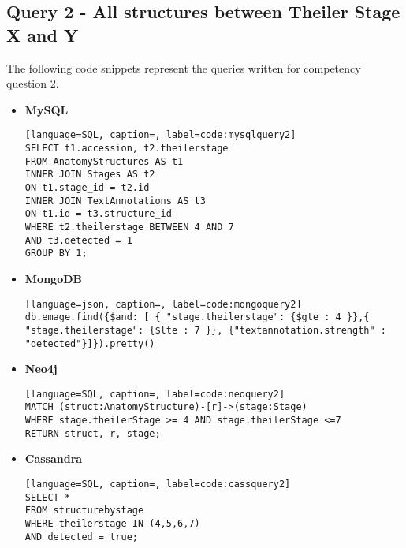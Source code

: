 \subsection*{Query 2 - All structures between Theiler Stage X and Y}\label{query2}
The following code snippets represent the queries written for competency question 2.
\begin{itemize}
\item \textbf{MySQL}
\begin{lstlisting}[language=SQL, caption=, label=code:mysqlquery2]
SELECT t1.accession, t2.theilerstage
FROM AnatomyStructures AS t1
INNER JOIN Stages AS t2
ON t1.stage_id = t2.id
INNER JOIN TextAnnotations AS t3
ON t1.id = t3.structure_id
WHERE t2.theilerstage BETWEEN 4 AND 7
AND t3.detected = 1
GROUP BY 1;
\end{lstlisting}
\item \textbf{MongoDB}
\begin{lstlisting}[language=json, caption=, label=code:mongoquery2]
db.emage.find({$and: [ { "stage.theilerstage": {$gte : 4 }},{ "stage.theilerstage": {$lte : 7 }}, {"textannotation.strength" : "detected"}]}).pretty()
\end{lstlisting}
\item \textbf{Neo4j}
\begin{lstlisting}[language=SQL, caption=, label=code:neoquery2]
MATCH (struct:AnatomyStructure)-[r]->(stage:Stage)
WHERE stage.theilerStage >= 4 AND stage.theilerStage <=7
RETURN struct, r, stage;
\end{lstlisting}
\item \textbf{Cassandra}
\begin{lstlisting}[language=SQL, caption=, label=code:cassquery2]
SELECT *
FROM structurebystage
WHERE theilerstage IN (4,5,6,7)
AND detected = true;
\end{lstlisting}
\end{itemize}
